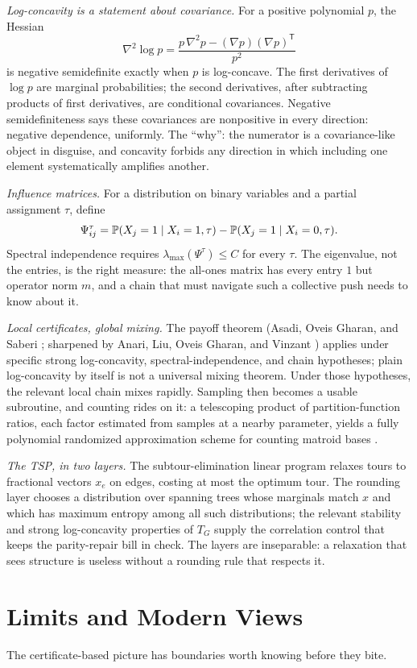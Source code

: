 \emph{Log-concavity is a statement about covariance.} For a positive polynomial $p$, the Hessian
\[
\nabla^2\log p=\frac{p\,\nabla^2p-(\nabla p)(\nabla p)^{\mathsf T}}{p^2}
\]
is negative semidefinite exactly when $p$ is log-concave. The first derivatives of $\log p$ are marginal probabilities; the second derivatives, after subtracting products of first derivatives, are conditional covariances. Negative semidefiniteness says these covariances are nonpositive in every direction: negative dependence, uniformly. The ``why'': the numerator is a covariance-like object in disguise, and concavity forbids any direction in which including one element systematically amplifies another.

\emph{Influence matrices.} For a distribution on binary variables and a partial assignment $\tau$, define
\[
\Psi^\tau_{ij}=\mathbb{P}(X_j=1\mid X_i=1,\tau)-\mathbb{P}(X_j=1\mid X_i=0,\tau).
\]
Spectral independence requires $\lambda_{\max}(\Psi^\tau)\le C$ for every $\tau$. The eigenvalue, not the entries, is the right measure: the all-ones matrix has every entry $1$ but operator norm $m$, and a chain that must navigate such a collective push needs to know about it.

\emph{Local certificates, global mixing.} The payoff theorem (Asadi, Oveis Gharan, and Saberi \cite{asadi20}; sharpened by Anari, Liu, Oveis Gharan, and Vinzant \cite{anari21}) applies under specific strong log-concavity, spectral-independence, and chain hypotheses; plain log-concavity by itself is not a universal mixing theorem. Under those hypotheses, the relevant local chain mixes rapidly. Sampling then becomes a usable subroutine, and counting rides on it: a telescoping product of partition-function ratios, each factor estimated from samples at a nearby parameter, yields a fully polynomial randomized approximation scheme for counting matroid bases \cite{anari19}.

\emph{The TSP, in two layers.} The subtour-elimination linear program relaxes tours to fractional vectors $x_e$ on edges, costing at most the optimum tour. The rounding layer chooses a distribution over spanning trees whose marginals match $x$ and which has maximum entropy among all such distributions; the relevant stability and strong log-concavity properties of $T_G$ supply the correlation control that keeps the parity-repair bill in check. The layers are inseparable: a relaxation that sees structure is useless without a rounding rule that respects it.

\section{Limits and Modern Views}
The certificate-based picture has boundaries worth knowing before they bite.

